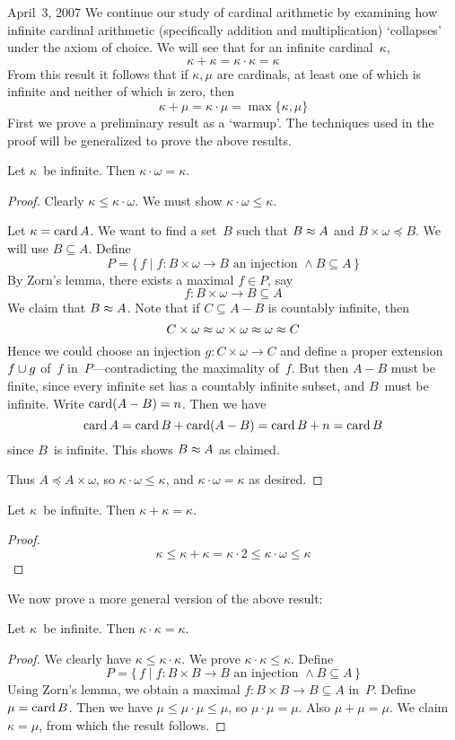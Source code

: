 \begin{lecture}{April~3, 2007}
We continue our study of cardinal arithmetic by examining how infinite cardinal arithmetic (specifically addition and multiplication) `collapses' under the axiom of choice. We will see that for an infinite cardinal~\(\kappa\),
\[\kappa+\kappa=\kappa\cdot\kappa=\kappa\]
From this result it follows that if \(\kappa,\mu\) are cardinals, at least one of which is infinite and neither of which is zero, then
\[\kappa+\mu=\kappa\cdot\mu=\max\{\kappa,\mu\}\]
First we prove a preliminary result as a `warmup'. The techniques used in the proof will be generalized to prove the above results.
\begin{thm}
Let \(\kappa\)~be infinite. Then \(\kappa\cdot\omega=\kappa\).
\end{thm}
\begin{proof}
Clearly \(\kappa\le\kappa\cdot\omega\). We must show \(\kappa\cdot\omega\le\kappa\).

Let \(\kappa=\operatorname{card} A\). We want to find a set~\(B\) such that \(B\approx A\) and \(B\times\omega\preceq B\). We will use \(B\subseteq A\). Define
\[P=\{\,f\mid f:B\times\omega\to B\text{ an injection }\land B\subseteq A\,\}\]
By Zorn's lemma, there exists a maximal \(f\in P\), say
\[f:B\times\omega\to B\subseteq A\]
We claim that \(B\approx A\). Note that if \(C\subseteq A-B\) is countably infinite, then
\[C\times\omega\approx\omega\times\omega\approx\omega\approx C\]
Hence we could choose an injection \(g:C\times\omega\to C\) and define a proper extension \(f\cup g\) of~\(f\) in~\(P\)---contradicting the maximality of~\(f\). But then \(A-B\) must be finite, since every infinite set has a countably infinite subset, and \(B\)~must be infinite. Write \(\operatorname{card}(A-B)=n\). Then we have
\[\operatorname{card} A=\operatorname{card} B+\operatorname{card}(A-B)=\operatorname{card} B+n=\operatorname{card} B\]
since \(B\)~is infinite. This shows \(B\approx A\) as claimed.

Thus \(A\preceq A\times\omega\), so \(\kappa\cdot\omega\le\kappa\), and \(\kappa\cdot\omega=\kappa\) as desired.
\end{proof}
\begin{cor}
Let \(\kappa\)~be infinite. Then \(\kappa+\kappa=\kappa\).
\end{cor}
\begin{proof}
\[\kappa\le\kappa+\kappa=\kappa\cdot2\le\kappa\cdot\omega\le\kappa\]
\end{proof}

We now prove a more general version of the above result:
\begin{thm}
Let \(\kappa\)~be infinite. Then \(\kappa\cdot\kappa=\kappa\).
\end{thm}
\begin{proof}
We clearly have \(\kappa\le\kappa\cdot\kappa\). We prove \(\kappa\cdot\kappa\le\kappa\). Define
\[P=\{\,f\mid f:B\times B\to B\text{ an injection }\land B\subseteq A\,\}\]
Using Zorn's lemma, we obtain a maximal \(f:B\times B\to B\subseteq A\) in~\(P\). Define \(\mu=\operatorname{card} B\). Then we have \(\mu\le\mu\cdot\mu\le\mu\), so \(\mu\cdot\mu=\mu\). Also \(\mu+\mu=\mu\). We claim \(\kappa=\mu\), from which the result follows.


\end{proof}
\end{lecture}

